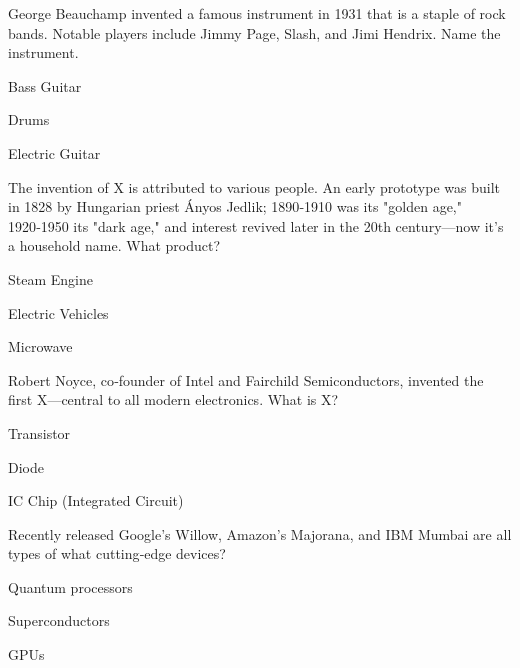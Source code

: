 \begin{enhancedmcq}{George Beauchamp invented a famous instrument in 1931 that is a staple of rock bands. Notable players include Jimmy Page, Slash, and Jimi Hendrix. Name the instrument.}
\item Bass Guitar
\item Drums
\item Electric Guitar

\end{enhancedmcq}
\begin{enhancedmcq}{The invention of X is attributed to various people. An early prototype was built in 1828 by Hungarian priest Ányos Jedlik; 1890‑1910 was its "golden age," 1920‑1950 its "dark age," and interest revived later in the 20th century—now it's a household name. What product?}
\item Steam Engine
\item Electric Vehicles
\item Microwave

\end{enhancedmcq}
\begin{enhancedmcq}{Robert Noyce, co‑founder of Intel and Fairchild Semiconductors, invented the first X—central to all modern electronics. What is X?}
\item Transistor
\item Diode
\item IC Chip (Integrated Circuit)

\end{enhancedmcq}
\begin{enhancedmcq}{Recently released Google's Willow, Amazon's Majorana, and IBM Mumbai are all types of what cutting‑edge devices?}
\item Quantum processors
\item Superconductors
\item GPUs
\end{enhancedmcq}